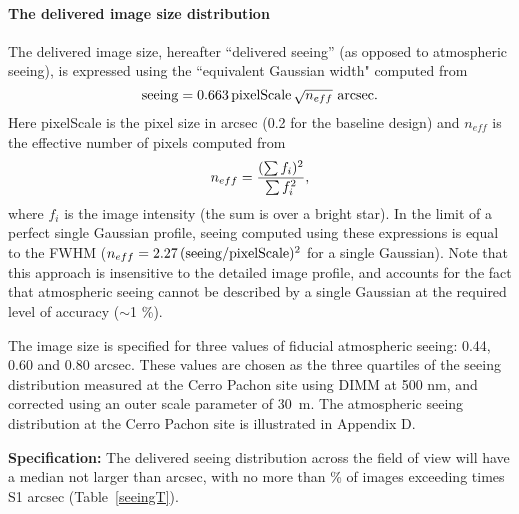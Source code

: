 \paragraph{The delivered image size distribution\\}


The delivered image size, hereafter ``delivered seeing'' (as opposed to
atmospheric seeing), is expressed using the ``equivalent Gaussian width"
computed from
\begin{equation}
      {\rm seeing} = 0.663 \, {\rm pixelScale} \, \sqrt{n_{eff}} \,\,{\rm arcsec}.
\end{equation}
Here pixelScale is the pixel size in arcsec (0.2 for the baseline
design) and $n_{eff}$ is the effective number of pixels computed from
\begin{equation}
        n_{eff}  = {(\sum f_i)^2 \over \sum f_i^2},
\end{equation}
where $f_i$ is the image intensity (\ie the sum is over a bright
star).  In the limit of a perfect single Gaussian profile, seeing computed
using these expressions is equal to the FWHM
($n_{eff}=2.27\,({\rm seeing/pixelScale})^2$ for a single Gaussian). Note that
this approach is insensitive to the detailed image profile, and accounts
for the fact that atmospheric seeing cannot be described by a single
Gaussian at the required level of accuracy ($\sim$1 \%).


The image size is specified for three values of fiducial atmospheric
seeing: 0.44, 0.60 and 0.80 arcsec. These values are chosen as the three
quartiles of the seeing distribution measured at the Cerro Pachon site
using DIMM at 500 nm, and corrected using an outer scale parameter of
30~m. The atmospheric seeing distribution at the
Cerro Pachon site is illustrated in Appendix D.


{\bf Specification:} The delivered seeing distribution across the field of
view will have a median not larger than
arcsec, with no more than
\% of images exceeding
times S1 arcsec (Table~\ref{seeingT}).

